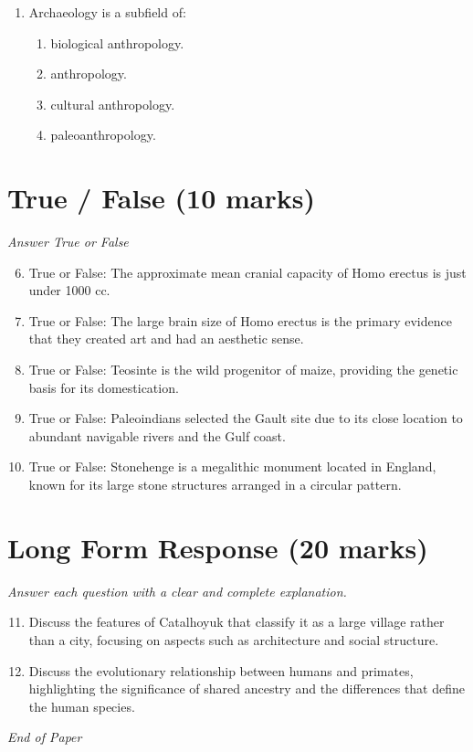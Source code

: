 \documentclass[12pt]{article}
\begin{document}
\begin{enumerate}[label=\arabic*.]
\begin{enumerate}[label=(\alph*)]
    \item happened everywhere except in South America.
    \item took thousands of years.
    \item took hundreds of thousands of years.
    \item always required careful planning.
\end{enumerate}
\item Archaeology is a subfield of:
\begin{enumerate}[label=(\alph*)]
    \item biological anthropology.
    \item anthropology.
    \item cultural anthropology.
    \item paleoanthropology.
\end{enumerate}
\end{enumerate}

\section*{True / False (10 marks)}
\textit{Answer True or False}
\begin{enumerate}[label=\arabic*.]
\setcounter{enumi}{5}
\item True or False: The approximate mean cranial capacity of Homo erectus is just under 1000 cc.
\item True or False: The large brain size of Homo erectus is the primary evidence that they created art and had an aesthetic sense.
\item True or False: Teosinte is the wild progenitor of maize, providing the genetic basis for its domestication.
\item True or False: Paleoindians selected the Gault site due to its close location to abundant navigable rivers and the Gulf coast.
\item True or False: Stonehenge is a megalithic monument located in England, known for its large stone structures arranged in a circular pattern.
\end{enumerate}

\section*{Long Form Response (20 marks)}
\textit{Answer each question with a clear and complete explanation.}
\begin{enumerate}[label=\arabic*.]
\setcounter{enumi}{10}
\item Discuss the features of Catalhoyuk that classify it as a large village rather than a city, focusing on aspects such as architecture and social structure.
\item Discuss the evolutionary relationship between humans and primates, highlighting the significance of shared ancestry and the differences that define the human species.
\end{enumerate}

\vfill
\noindent\textit{End of Paper}
\end{document}
